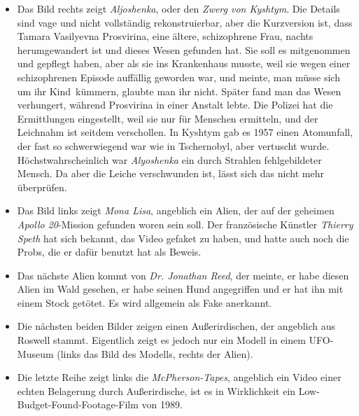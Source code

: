 \documentclass{scrartcl}
\begin{document}
\begin{itemize}
	\item Das Bild rechts zeigt \textit{Aljoshenka}, oder den \textit{Zwerg von Kyshtym}. Die Details sind vage und nicht vollständig rekonstruierbar, aber die Kurzversion ist, dass Tamara Vasilyevna Prosvirina, eine ältere, schizophrene Frau, nachts herumgewandert ist und dieses Wesen gefunden hat. Sie soll es mitgenommen und gepflegt haben, aber als sie ins Krankenhaus musste, weil sie wegen einer schizophrenen Episode auffällig geworden war, und meinte, man müsse sich um \frqq ihr Kind\flqq\ kümmern, glaubte man ihr nicht. Später fand man das Wesen verhungert, während Prosvirina in einer Anstalt lebte. Die Polizei hat die Ermittlungen eingestellt, weil sie \frqq nur für Menschen ermitteln\flqq, und der Leichnahm ist seitdem verschollen. In Kyshtym gab es 1957 einen Atomunfall, der fast so schwerwiegend war wie in Tschernobyl, aber vertuscht wurde. Höchstwahrscheinlich war \textit{Alyoshenka} ein durch Strahlen fehlgebildeter Mensch. Da aber die Leiche verschwunden ist, lässt sich das nicht mehr überprüfen.  
	\item Das Bild links zeigt \textit{Mona Lisa}, angeblich ein Alien, der auf der geheimen \textit{Apollo 20}-Mission gefunden woren sein soll. Der französische Künstler \textit{Thierry Speth} hat sich bekannt, das Video gefaket zu haben, und hatte auch noch die Probs, die er dafür benutzt hat als Beweis. 
	\item Das nächste Alien kommt von \textit{Dr. Jonathan Reed}, der meinte, er habe diesen Alien im Wald gesehen, er habe seinen Hund angegriffen und er hat ihn mit einem Stock getötet. Es wird allgemein als Fake anerkannt. 
	\item Die nächsten beiden Bilder zeigen einen \frqq Außerirdischen\flqq, der angeblich aus Roswell stammt. Eigentlich zeigt es jedoch nur ein Modell in einem UFO-Museum (links das Bild des Modells, rechts der \frqq Alien\flqq). 
	\item Die letzte Reihe zeigt links die \textit{McPherson-Tapes}, angeblich ein Video einer echten Belagerung durch Außerirdische, ist es in Wirklichkeit ein Low-Budget-Found-Footage-Film von 1989. 

\end{itemize}
\end{document}
